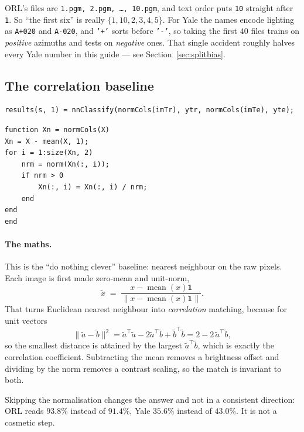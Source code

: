 \begin{gotcha}
ORL's files are \texttt{1.pgm, 2.pgm, \ldots, 10.pgm}, and text order puts
\texttt{10} straight after \texttt{1}. So ``the first six'' is really
$\{1,10,2,3,4,5\}$. For Yale the names encode lighting as \texttt{A+020} and
\texttt{A-020}, and \texttt{'+'} sorts before \texttt{'-'}, so taking the first
$40$ files trains on \emph{positive} azimuths and tests on \emph{negative}
ones. That single accident roughly halves every Yale number in this guide ---
see Section~\ref{sec:splitbias}.
\end{gotcha}

\subsection{The correlation baseline}

\begin{lstlisting}
results(s, 1) = nnClassify(normCols(imTr), ytr, normCols(imTe), yte);
\end{lstlisting}

\begin{lstlisting}
function Xn = normCols(X)
Xn = X - mean(X, 1);
for i = 1:size(Xn, 2)
    nrm = norm(Xn(:, i));
    if nrm > 0
        Xn(:, i) = Xn(:, i) / nrm;
    end
end
end
\end{lstlisting}

\paragraph{The maths.} This is the ``do nothing clever'' baseline: nearest
neighbour on the raw pixels. Each image is first made zero-mean and unit-norm,
\[
  \tilde{x} \;=\; \frac{x - \operatorname{mean}(x)\mathbf{1}}{\|x - \operatorname{mean}(x)\mathbf{1}\|} .
\]
That turns Euclidean nearest neighbour into \emph{correlation} matching,
because for unit vectors
\[
  \|\tilde a - \tilde b\|^2
  = \tilde a^{\!\top}\tilde a - 2\tilde a^{\!\top}\tilde b + \tilde b^{\!\top}\tilde b
  = 2 - 2\,\tilde a^{\!\top}\tilde b ,
\]
so the smallest distance is attained by the largest $\tilde a^{\!\top}\tilde b$,
which is exactly the correlation coefficient. Subtracting the mean removes a
brightness offset and dividing by the norm removes a contrast scaling, so the
match is invariant to both.

\begin{observation}
Skipping the normalisation changes the answer and not in a consistent
direction: ORL reads $93.8\%$ instead of $91.4\%$, Yale $35.6\%$ instead of
$43.0\%$. It is not a cosmetic step.
\end{observation}

